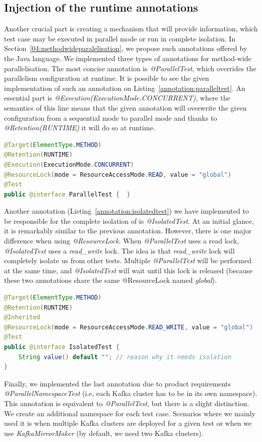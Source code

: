 \subsection{Injection of the runtime annotations}
\label{05:sub:sec:annotations}

Another crucial part is creating a mechanism that will provide information, which test case may be executed in parallel
mode or run in complete isolation.
In Section~\ref{04:methodwideparalelisation}, we propose such annotations offered by the Java language.
We implemented three types of annotations for method-wide parallelisation.
The most concise annotation is \emph{@ParallelTest}, which overrides the parallelism configuration at runtime.
It is possible to see the given implementation of such an annotation on Listing~\ref{annotation:paralleltest}.
An essential part is \emph {@Execution(ExecutionMode.CONCURRENT)}, where the semantics of this line means that the given
annotation will overwrite the given configuration from a sequential mode to parallel mode and thanks to \emph {@Retention(RUNTIME)} it will do so at runtime.

\begin{lstlisting}[language=Java,label=annotation:paralleltest,caption=Implementation of the @ParallelTest annotation,frame=tb]
@Target(ElementType.METHOD)
@Retention(RUNTIME)
@Execution(ExecutionMode.CONCURRENT)
@ResourceLock(mode = ResourceAccessMode.READ, value = "global")
@Test
public @interface ParallelTest {  }
\end{lstlisting}
Another annotation (Listing~\ref{annotation:isolatedtest}) we have implemented to be responsible for the complete isolation of is \emph{@IsolatedTest}.
At an initial glance, it is remarkably similar to the previous annotation.
However, there is one major difference when using \emph{@ResourceLock}.
When \emph {@ParallelTest} uses a read lock, \emph{@IsolatedTest} uses a \emph{read\_write} lock.
The idea is that \emph{read\_write} lock will completely isolate us from other tests.
Multiple \emph{@ParallelTest} will be performed at the same time, and \emph{@IsolatedTest} will wait until this lock is
released (because these two annotations share the same @ResourceLock named \emph{global}).

\begin{lstlisting}[language=Java,label=annotation:isolatedtest,caption=Implementation of the @IsolatedTest annotation,frame=tb]
@Target(ElementType.METHOD)
@Retention(RUNTIME)
@Inherited
@ResourceLock(mode = ResourceAccessMode.READ_WRITE, value = "global")
@Test
public @interface IsolatedTest {
    String value() default ""; // reason why it needs isolation
}
\end{lstlisting}
Finally, we implemented the last annotation due to product requirements \emph{@ParallelNamespaceTest} (i.e, each Kafka cluster
has to be in its own namespace).
This annotation is equivalent to \emph{@ParallelTest}, but there is a slight distinction.
We create an additional namespace for each test case.
Scenarios where we mainly used it is when multiple Kafka clusters are deployed for a given test or when we use
\emph{KafkaMirrorMaker} (by default, we need two Kafka clusters).

